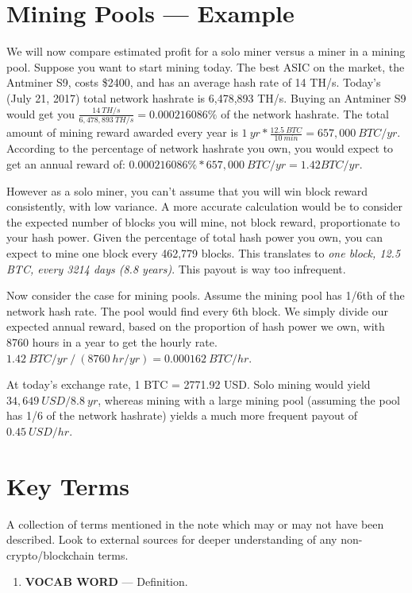 \documentclass[full.tex]{subfiles}
\begin{document}
    \section*{Mining Pools --- Example}
    
    We will now compare estimated profit for a solo miner versus a miner in a mining pool. Suppose you want to start mining today. The best ASIC on the market, the Antminer S9, costs \$2400, and has an average hash rate of 14 TH/s. Today's (July 21, 2017) total network hashrate is 6,478,893 TH/s. Buying an Antminer S9 would get you $\frac{14~TH/s}{6,478,893~TH/s} = 0.000216086\%$ of the network hashrate. The total amount of mining reward awarded every year is $1~yr * \frac{12.5~BTC}{10~min} = 657,000~BTC/yr$. According to the percentage of network hashrate you own, you would expect to get an annual reward of: $0.000216086\% * 657,000~BTC/yr = 1.42 BTC/yr$. 
    
    However as a solo miner, you can't assume that you will win block reward consistently, with low variance. A more accurate calculation would be to consider the expected number of blocks you will mine, not block reward, proportionate to your hash power. Given the percentage of total hash power you own, you can expect to mine one block every 462,779 blocks. This translates to \textit{one block, 12.5 BTC, every 3214 days (8.8 years)}. This payout is way too infrequent.
    
    Now consider the case for mining pools. Assume the mining pool has 1/6th of the network hash rate. The pool would find every 6th block. We simply divide our expected annual reward, based on the proportion of hash power we own, with 8760 hours in a year to get the hourly rate. $1.42~BTC/yr~/~(8760~hr/yr) = 0.000162~BTC/hr$. 
    
    At today's exchange rate, 1 BTC = 2771.92 USD. Solo mining would yield $34,649~USD/8.8~yr$, whereas mining with a large mining pool (assuming the pool has 1/6 of the network hashrate) yields a much more frequent payout of $0.45~USD/hr$.
    
    \newpage
    \thispagestyle{firstpage}
    \vspace*{3\baselineskip}
    \section*{Key Terms}
    \noindent A collection of terms mentioned in the note which may or may not have been described. Look to external sources for deeper understanding of any non-crypto/blockchain terms.
    \begin{enumerate}
        \item \textbf{VOCAB WORD} --- Definition. %
    \end{enumerate}
\end{document}
